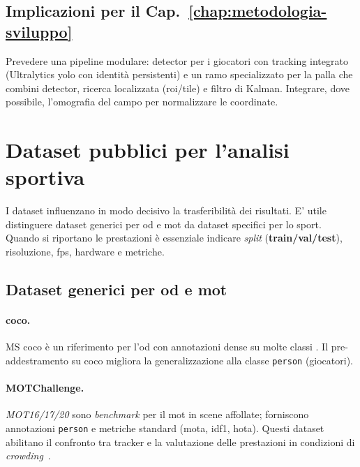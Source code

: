 \documentclass[12pt,a4paper,openright,twoside]{book}
\begin{document}
\subsection*{Implicazioni per il Cap.~\ref{chap:metodologia-sviluppo}}
Prevedere una pipeline modulare: detector per i giocatori 
con tracking integrato (Ultralytics \ac{yolo} con identità persistenti)
e un ramo specializzato per la palla che combini detector, ricerca 
localizzata (\ac{roi}/tile) e filtro di Kalman. Integrare, dove possibile, 
l'omografia del campo per normalizzare le coordinate.


\section{Dataset pubblici per l'analisi sportiva}
\label{sec:dataset-pubblici}

I dataset influenzano in modo decisivo la trasferibilità dei risultati. 
E' utile distinguere dataset generici per \ac{od} e \ac{mot} da dataset 
specifici per lo sport. Quando si riportano le prestazioni è essenziale 
indicare \emph{split} (\textbf{train/val/test}), risoluzione, \ac{fps}, 
hardware e metriche.

\subsection{Dataset generici per \ac{od} e \ac{mot}}

\paragraph{\ac{coco}.} MS \ac{coco} è un riferimento per l'\ac{od} 
con annotazioni dense su molte classi \cite{Lin2014Microsoft}. 
Il pre-addestramento su \ac{coco} migliora la generalizzazione 
alla classe \texttt{person} (giocatori).

\paragraph{MOTChallenge.} \emph{MOT16/17/20} sono \emph{benchmark} 
per il \ac{mot} in scene affollate; forniscono annotazioni 
\texttt{person} e metriche standard (\ac{mota}, \ac{idf1}, \ac{hota}). 
Questi dataset abilitano il confronto tra tracker e la valutazione 
delle prestazioni in condizioni di 
\emph{crowding}~\cite{Milan2016MOT16, Leal-Taixe2017MOT17, Dendorfer2020MOT20}.
\end{document}
